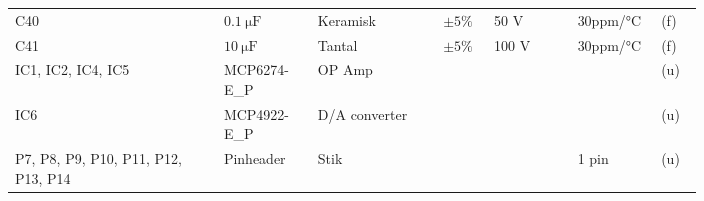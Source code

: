 \begin{table}[h!]
\begin{threeparttable}
\begin{tabular}{p{0.25\linewidth}p{0.1\linewidth}p{0.15\linewidth}p{0.05\linewidth}p{0.1\linewidth}p{0.1\linewidth}p{0.05\linewidth}}
C40 & $\SI{0.1}{\micro\farad}$ & Keramisk & $\pm 5\%$ & 50 \si{\volt} & 30ppm/\si{\celsius} & (f)\\
C41 & $\SI{10}{\micro\farad}$ & Tantal & $\pm 5\%$ & 100 \si{\volt} & 30ppm/\si{\celsius} & (f)\\
\midrule
IC1, IC2, IC4, IC5 & MCP6274-E\_P & OP Amp &  &  &  & (u) \\
IC6 & MCP4922-E\_P & D/A converter &  &  &  & (u) \\
P7, P8, P9, P10, P11, P12, P13, P14 & Pinheader & Stik &  &  & 1 pin & (u) \\

\end{tabular}
\end{threeparttable}
\end{table}
